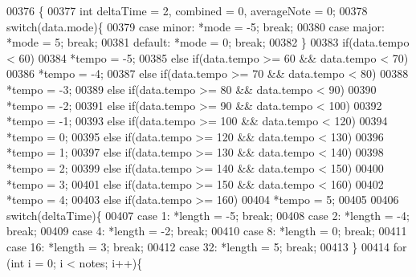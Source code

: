 \begin{DoxyCode}
00376                                                                                                            
              \{
00377   \textcolor{keywordtype}{int} deltaTime = 2, combined = 0, averageNote = 0;
00378   \textcolor{keywordflow}{switch}(data.mode)\{
00379     \textcolor{keywordflow}{case} minor: *mode = -5; \textcolor{keywordflow}{break};
00380     \textcolor{keywordflow}{case} major: *mode = 5; \textcolor{keywordflow}{break};
00381     \textcolor{keywordflow}{default}: *mode = 0; \textcolor{keywordflow}{break};
00382   \}
00383   \textcolor{keywordflow}{if}(data.tempo < 60)
00384     *tempo = -5;
00385   \textcolor{keywordflow}{else} \textcolor{keywordflow}{if}(data.tempo >= 60 && data.tempo < 70)
00386     *tempo = -4;
00387   \textcolor{keywordflow}{else} \textcolor{keywordflow}{if}(data.tempo >= 70 && data.tempo < 80)
00388     *tempo = -3;  
00389   \textcolor{keywordflow}{else} \textcolor{keywordflow}{if}(data.tempo >= 80 && data.tempo < 90)
00390     *tempo = -2;
00391   \textcolor{keywordflow}{else} \textcolor{keywordflow}{if}(data.tempo >= 90 && data.tempo < 100)
00392     *tempo = -1;
00393   \textcolor{keywordflow}{else} \textcolor{keywordflow}{if}(data.tempo >= 100 && data.tempo < 120)
00394     *tempo =  0;  
00395   \textcolor{keywordflow}{else} \textcolor{keywordflow}{if}(data.tempo >= 120 && data.tempo < 130)
00396     *tempo =  1;
00397   \textcolor{keywordflow}{else} \textcolor{keywordflow}{if}(data.tempo >= 130 && data.tempo < 140)
00398     *tempo =  2;
00399   \textcolor{keywordflow}{else} \textcolor{keywordflow}{if}(data.tempo >= 140 && data.tempo < 150)
00400     *tempo =  3;
00401   \textcolor{keywordflow}{else} \textcolor{keywordflow}{if}(data.tempo >= 150 && data.tempo < 160)
00402     *tempo =  4;
00403   \textcolor{keywordflow}{else} \textcolor{keywordflow}{if}(data.tempo >=  160)
00404     *tempo =  5;
00405 
00406   \textcolor{keywordflow}{switch}(deltaTime)\{
00407     \textcolor{keywordflow}{case} 1: *length = -5; \textcolor{keywordflow}{break};
00408     \textcolor{keywordflow}{case} 2: *length = -4; \textcolor{keywordflow}{break};
00409     \textcolor{keywordflow}{case} 4: *length = -2; \textcolor{keywordflow}{break};
00410     \textcolor{keywordflow}{case} 8: *length =  0; \textcolor{keywordflow}{break};
00411     \textcolor{keywordflow}{case} 16: *length = 3; \textcolor{keywordflow}{break};
00412     \textcolor{keywordflow}{case} 32: *length = 5; \textcolor{keywordflow}{break};
00413   \}
00414   \textcolor{keywordflow}{for} (\textcolor{keywordtype}{int} i = 0; i < notes; i++)\{

\end{DoxyCode}
